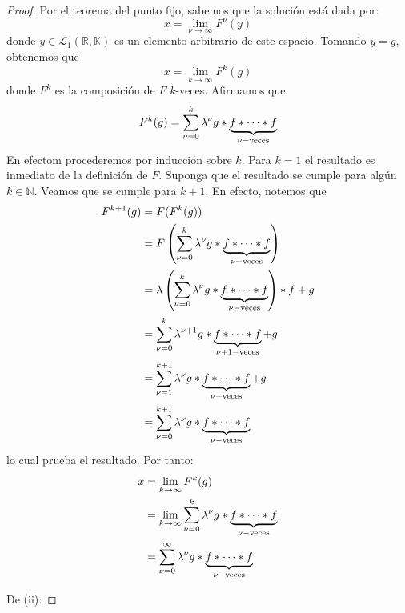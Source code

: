 \documentclass[12pt]{report}
\theoremstyle{largebreak}
\begin{document}
\begin{proof}
        Por el teorema del punto fijo, sabemos que la solución está dada por:
        \begin{equation*}
            x=\lim_{\nu\rightarrow\infty}F^\nu(y)
        \end{equation*}
        donde $y\in\mathcal{L}_1(\mathbb{R},\mathbb{K})$ es un elemento arbitrario de este espacio. Tomando $y=g$, obtenemos que
        \begin{equation*}
            x=\lim_{k\rightarrow\infty}F^k(g)
        \end{equation*}
        donde $F^k$ es la composición de $F$ $k$-veces. Afirmamos que
        \begin{equation*}
            F^k(g)=\sum_{\nu=0}^k\lambda^\nu g*\underbrace{f*\cdots*f}_{\nu-\textup{veces}}
        \end{equation*}
        En efectom procederemos por inducción sobre $k$. Para $k=1$ el resultado es inmediato de la definición de $F$. Suponga que el resultado se cumple para algún $k\in\mathbb{N}$. Veamos que se cumple para $k+1$. En efecto, notemos que
        \begin{equation*}
            \begin{split}
                F^{k+1}(g)&=F(F^k(g))\\
                &=F\left(\sum_{\nu=0}^k\lambda^\nu g*\underbrace{f*\cdots*f}_{\nu-\textup{veces}} \right)\\
                &=\lambda\left(\sum_{\nu=0}^k\lambda^\nu g*\underbrace{f*\cdots*f}_{\nu-\textup{veces}}\right)*f+g\\
                &=\sum_{\nu=0}^k\lambda^{\nu+1} g*\underbrace{f*\cdots*f}_{\nu+1-\textup{veces}}+g\\
                &=\sum_{\nu=1}^{k+1}\lambda^{\nu} g*\underbrace{f*\cdots*f}_{\nu-\textup{veces}}+g\\
                &=\sum_{\nu=0}^{k+1}\lambda^{\nu} g*\underbrace{f*\cdots*f}_{\nu-\textup{veces}}\\
            \end{split}
        \end{equation*}
        lo cual prueba el resultado. Por tanto:
        \begin{equation*}
            \begin{split}
                x&=\lim_{ k\rightarrow\infty}F^k(g)\\
                &=\lim_{ k\rightarrow\infty}\sum_{\nu=0}^{k}\lambda^{\nu} g*\underbrace{f*\cdots*f}_{\nu-\textup{veces}}\\
                &=\sum_{\nu=0}^{\infty}\lambda^{\nu} g*\underbrace{f*\cdots*f}_{\nu-\textup{veces}}\\
            \end{split}
        \end{equation*}
        
        De (ii): 
    \end{proof}
\end{document}
